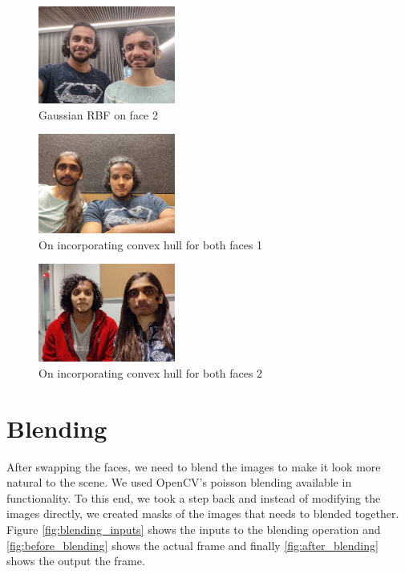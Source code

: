 \documentclass[conference]{IEEEtran}
\begin{document}
\begin{figure}[!htbp]
\centering
\includegraphics[width=0.4\textwidth]{media/incorporate_gaussian_face2.jpg}
\caption{Gaussian RBF on face 2}
\label{fig:inc_gaussian_rbf_face2}
\end{figure}

\begin{figure}[!htbp]
\centering
\includegraphics[width=0.4\textwidth]{media/convex_hull_both_faces1.jpg}
\caption{On incorporating convex hull for both faces 1}
\label{fig:inc_convex_hull_both_faces_1}
\end{figure}

\begin{figure}[!htbp]
\centering
\includegraphics[width=0.4\textwidth]{media/convex_hull_both_faces2.jpg}
\caption{On incorporating convex hull for both faces 2}
\label{fig:inc_convex_hull_both_faces_2}
\end{figure}

\section{Blending}

After swapping the faces, we need to blend the images to make it look more natural to the scene. We used OpenCV's poisson blending available in  functionality. To this end, we took a step back and instead of modifying the images directly, we created masks of the images that needs to blended together. Figure \ref{fig:blending_inputs} shows the inputs to the blending operation and \ref{fig:before_blending} shows the actual frame and finally \ref{fig:after_blending} shows the output the frame. 
\end{document}
